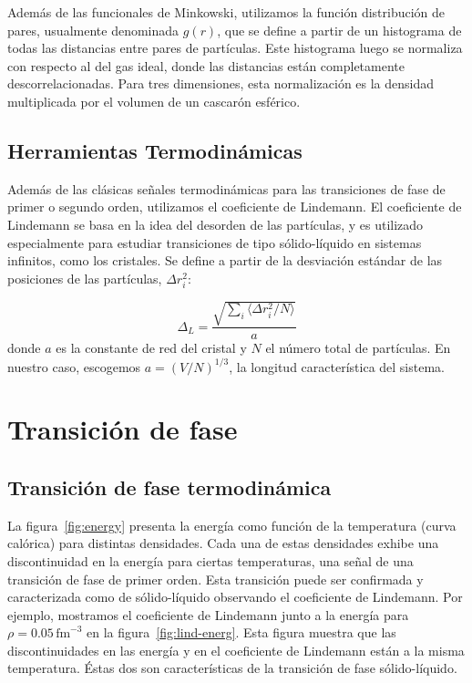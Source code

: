 Además de las funcionales de Minkowski, utilizamos la función distribución de pares, usualmente denominada $g(r)$, que se define a partir de un histograma de todas las distancias entre pares de partículas.
Este histograma luego se normaliza con respecto al del gas ideal, donde las distancias están completamente descorrelacionadas.
Para tres dimensiones, esta normalización es la densidad multiplicada por el volumen de un cascarón esférico.

\subsection{Herramientas Termodinámicas}

Además de las clásicas señales termodinámicas para las transiciones de fase de primer o segundo orden, utilizamos el coeficiente de Lindemann.
El coeficiente de Lindemann se basa en la idea del desorden de las partículas, y es utilizado especialmente para estudiar transiciones de tipo sólido-líquido en sistemas infinitos, como los cristales.
Se define a partir de la desviación estándar de las posiciones de las partículas, $\Delta
r_i^2$:

\begin{equation*}
\Delta_L = \frac{\sqrt{\sum_i\langle\Delta r_i^2/N\rangle}}{a}
\end{equation*}
donde $a$ es la constante de red del cristal y $N$ el número total de partículas.
En nuestro caso, escogemos $a=(V/N)^{1/3}$, la longitud característica del sistema.


\section{Transición de fase}\label{phase_transition}
\subsection{Transición de fase termodinámica}

La figura~\ref{fig:energy} presenta la energía como función de la temperatura (curva calórica) para distintas densidades.
Cada una de estas densidades exhibe una discontinuidad en la energía para ciertas temperaturas, una señal de una transición de fase de primer orden.
Esta transición puede ser confirmada y caracterizada como de sólido-líquido observando el coeficiente de Lindemann. Por ejemplo, mostramos el coeficiente de Lindemann junto a la energía para $\rho=0.05\,\text{fm}^{-3}$ en la figura~\ref{fig:lind-energ}.
Esta figura muestra que las discontinuidades en las energía y en el coeficiente de Lindemann están a la misma temperatura.
Éstas dos son características de la transición de fase sólido-líquido.

